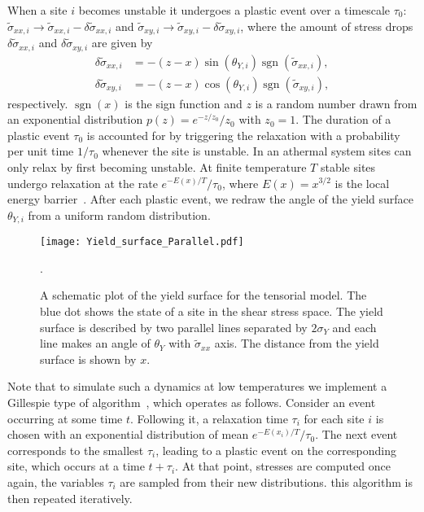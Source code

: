 \documentclass[pre,twocolumn,superscriptaddress,tightenlines,showpacs,longbibliography,floatfix,footinbib]{revtex4-1}
\DeclareMathOperator{\sgn}{sgn}
\begin{document}
When a site $i$ becomes unstable it undergoes a plastic event over a timescale $\tau_0$: $\tilde \sigma_{xx,i} \to \tilde \sigma_{xx,i} - \delta \tilde \sigma_{xx,i}$ and $\tilde \sigma_{xy,i} \to \tilde \sigma_{xy,i} - \delta \tilde \sigma_{xy,i}$, where the amount of stress drops $\delta \tilde \sigma_{xx,i}$ and $\delta \tilde \sigma_{xy,i}$ are given by
\begin{align}
\delta \tilde \sigma_{xx,i} &= -(z - x) \sin(\theta_{Y,i}) \sgn({\tilde\sigma_{xx,i}}), \\
\delta \tilde \sigma_{xy,i} &= -(z - x) \cos(\theta_{Y,i}) \sgn({\tilde\sigma_{xy,i}}),
\end{align}
respectively.
$\sgn(x)$ is the sign function and $z$ is a random number drawn from an exponential distribution $p(z)=e^{-z/z_0}/z_0$ with $z_0=1$. The duration of a plastic event $\tau_0$ is accounted for by triggering the relaxation with a probability per unit time $1/\tau_0$ whenever the site is unstable.
In an athermal system sites can only relax by first becoming unstable. At finite temperature $T$ stable sites  undergo relaxation at the rate  $e^{-E(x)/T}/\tau_0$, where $E(x) = x^{3/2}$ is the local energy barrier~\cite{popovic2021thermally}.
After each plastic event, we redraw the angle of the yield surface $\theta_{Y, i}$ from a uniform random distribution.

\begin{figure}
    \centering
    \texttt{[image: Yield\_surface\_Parallel.pdf]}
    \caption{A schematic plot of the yield surface for the tensorial model. The blue dot shows the state of a site in the shear stress space. The yield surface is described by two parallel lines separated by $2\sigma_Y$ and each line makes an angle of $\theta_Y$ with $\tilde \sigma_{xx}$ axis. The distance from the yield surface is shown by $x$.}.
    \label{fig:yield_surface_schemati}
\end{figure}

Note that to simulate such a dynamics at low temperatures we implement a Gillespie type of algorithm~\cite{popovic2021thermally}, which operates as follows.  Consider an event occurring at some time $t$. Following it, a relaxation time $\tau_i$ for each site $i$ is chosen with an exponential distribution of mean  $e^{-E(x_i)/T}/\tau_0$. The next event corresponds to the smallest $\tau_i$, leading to a plastic event on the corresponding site, which occurs at  a time $t+\tau_i$. At that point, stresses are computed once again,  the variables $\tau_i$ are sampled from their new distributions. this algorithm is then repeated iteratively.
\end{document}
